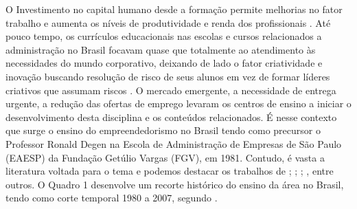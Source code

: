 O Investimento no  capital  humano desde a formação permite  melhorias  no fator trabalho e aumenta os níveis de produtividade e renda dos profissionais \cite{macedo_capital_2019}. Até pouco tempo, os currículos educacionais nas escolas e cursos relacionados a administração no Brasil focavam quase que totalmente ao atendimento às necessidades do mundo corporativo, deixando de lado o fator criatividade e inovação buscando resolução de risco de seus alunos em vez de formar líderes criativos que assumam riscos \cite{sanna_evolution_1999}. O mercado emergente, a necessidade de entrega urgente, a redução das ofertas de emprego levaram os centros de ensino a iniciar o desenvolvimento desta disciplina e os conteúdos relacionados. É nesse contexto que surge o ensino do empreendedorismo no Brasil tendo como precursor o Professor Ronald Degen \cite{koerner_designing_1990} na Escola de Administração de Empresas de São Paulo (EAESP) da Fundação Getúlio Vargas (FGV), em 1981. Contudo, é vasta a literatura voltada para o tema e podemos destacar os trabalhos de  ; ; ; ,  entre outros. O Quadro 1 desenvolve um recorte histórico do ensino da área no Brasil, tendo como corte temporal 1980 a 2007, segundo \cite{fernandes_breve_2013}. 




